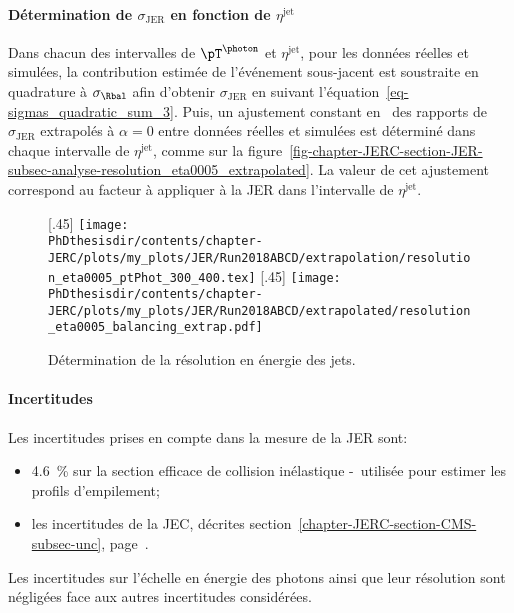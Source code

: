 \paragraph{Détermination de $\sigma_\text{JER}$ en fonction de $\eta^\text{jet}$}
Dans chacun des intervalles de $\pT^{\photon}$ et $\eta^\text{jet}$, pour les données réelles et simulées, la contribution estimée de l'événement sous-jacent est soustraite en quadrature à $\sigma_{\Rbal}$ afin d'obtenir $\sigma_\text{JER}$ en suivant l'équation~\eqref{eq-sigmas_quadratic_sum_3}.
Puis, un ajustement constant en \pT\ des rapports de $\sigma_\text{JER}$ extrapolés à $\alpha=0$ entre données réelles et simulées est déterminé dans chaque intervalle de $\eta^\text{jet}$, comme sur la figure~\ref{fig-chapter-JERC-section-JER-subsec-analyse-resolution_eta0005_extrapolated}.
La valeur de cet ajustement correspond au facteur à appliquer à la JER dans l'intervalle de $\eta^\text{jet}$.
\begin{figure}[h]
\centering
{}[.45\textwidth]
{\texttt{[image: \\PhDthesisdir/contents/chapter-JERC/plots/my\_plots/JER/Run2018ABCD/extrapolation/resolution\_eta0005\_ptPhot\_300\_400.tex]}}
\hfill
{}[.45\textwidth]
{\texttt{[image: \\PhDthesisdir/contents/chapter-JERC/plots/my\_plots/JER/Run2018ABCD/extrapolated/resolution\_eta0005\_balancing\_extrap.pdf]}}

\caption{Détermination de la résolution en énergie des jets.}
\end{figure}
\paragraph{Incertitudes}
Les incertitudes prises en compte dans la mesure de la JER sont:
\begin{itemize}
\item \SI{4.6}{\%} sur la section efficace de collision inélastique \proton-\proton\ utilisée pour estimer les profils d'empilement;
\item les incertitudes de la JEC, décrites section~\ref{chapter-JERC-section-CMS-subsec-unc}, page~\pageref{chapter-JERC-section-CMS-subsec-unc}.
\end{itemize}
Les incertitudes sur l'échelle en énergie des photons ainsi que leur résolution sont négligées face aux autres incertitudes considérées.
